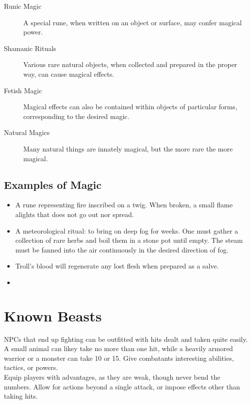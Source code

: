 \documentclass[a4paper]{article}
\begin{document}
\begin{multicols}{2}
\begin{description}
\item[Runic Magic] A special rune, when written on an object or surface, may confer magical power. 
\item[Shamanic Rituals] Various rare natural objects, when collected and prepared in the proper way, can cause magical effects.
\item[Fetish Magic] Magical effects can also be contained within objects of particular forms, corresponding to the desired magic.
\item[Natural Magics] Many natural things are innately magical, but the more rare the more magical.
\end{description}

\subsection{Examples of Magic}

\begin{itemize}
\item A rune representing fire inscribed on a twig. When broken, a small flame alights that does not go out nor spread.
\item A meteorological ritual: to bring on deep fog for weeks. One must gather a collection of rare herbs and boil them in a stone pot until empty. The steam must be fanned into the air continuously in the desired direction of fog. 
\item Troll's blood will regenerate any lost flesh when prepared as a salve.
\item 
\end{itemize}

\section{Known Beasts}

NPCs that end up fighting can be outfitted with hits dealt and taken quite easily.
A small animal can likey take no more than one hit, while a heavily armored warrior or a monster can take 10 or 15. Give combatants interesting abilities, tactics, or powers. \\

Equip players with advantages, as they are weak, though never bend the numbers.
Allow for actions beyond a single attack, or impose effects other than taking hits. \\


\end{multicols}
\end{document}
